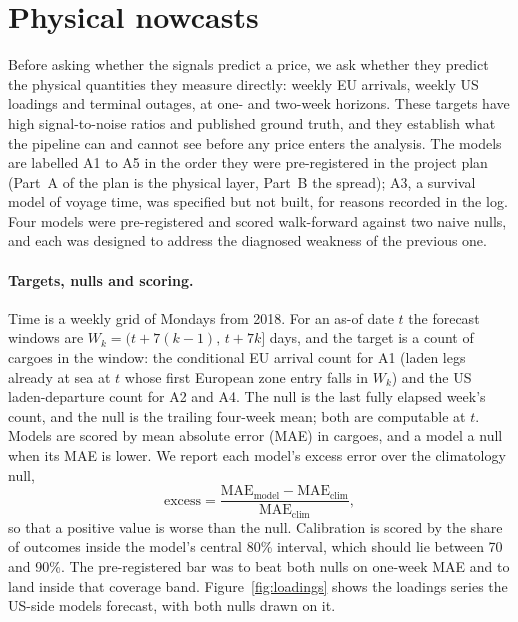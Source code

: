 \section{Physical nowcasts}\label{sec:parta}

Before asking whether the signals predict a price, we ask whether they predict the
physical quantities they measure directly: weekly EU arrivals, weekly US loadings
and terminal outages, at one- and two-week horizons. These targets have high
signal-to-noise ratios and published ground truth, and they establish what the
pipeline can and cannot see before any price enters the analysis. The models are
labelled A1 to A5 in the order they were pre-registered in the project plan (Part~A
of the plan is the physical layer, Part~B the spread); A3, a survival model of
voyage time, was specified but not built, for reasons recorded in the log. Four
models were pre-registered and scored walk-forward against two naive nulls, and
each was designed to address the diagnosed weakness of the previous one.

\paragraph{Targets, nulls and scoring.} Time is a weekly grid of Mondays from
2018. For an as-of date $t$ the forecast windows are $W_k = (t + 7(k-1),\, t + 7k]$
days, and the target is a count of cargoes in the window: the conditional EU
arrival count for A1 (laden legs already at sea at $t$ whose first European zone
entry falls in $W_k$) and the US laden-departure count for A2 and A4. The
 null is the last fully elapsed week's count, and the
 null is the trailing four-week mean; both are computable at $t$.
Models are scored by mean absolute error (MAE) in cargoes, and a model
 a null when its MAE is lower. We report each model's excess error over
the climatology null,
\begin{equation}
  \text{excess} = \frac{\mathrm{MAE}_{\text{model}} - \mathrm{MAE}_{\text{clim}}}{\mathrm{MAE}_{\text{clim}}},
  \label{eq:excess}
\end{equation}
so that a positive value is worse than the null. Calibration is scored by the share
of outcomes inside the model's central 80\% interval, which should lie between 70
and 90\%. The pre-registered bar was to beat both nulls on one-week MAE and to land
inside that coverage band. Figure~\ref{fig:loadings} shows the loadings series the
US-side models forecast, with both nulls drawn on it.

